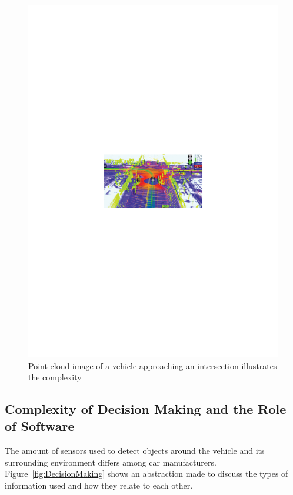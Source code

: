 \begin{figure}[h]
\centering
\includegraphics[width=1\linewidth]{Figures/pointCloud.pdf}
\caption{Point cloud image of a vehicle approaching an intersection illustrates the complexity \cite{EarthImagingJournalEIJ:RemoteSensingSatelliteImages2012}}
\label{fig:PointCloudImageGoogle}
\end{figure}

\subsection{Complexity of Decision Making and the Role of Software}
\label{sec:SelfDrivingCarsBasics:ComplexityOfDecisionMaking}

The amount of sensors used to detect objects around the vehicle and its surrounding environment differs among car manufacturers. Figure~\ref{fig:DecisionMaking} shows an abstraction made to discuss the types of information used and how they relate to each other. 

